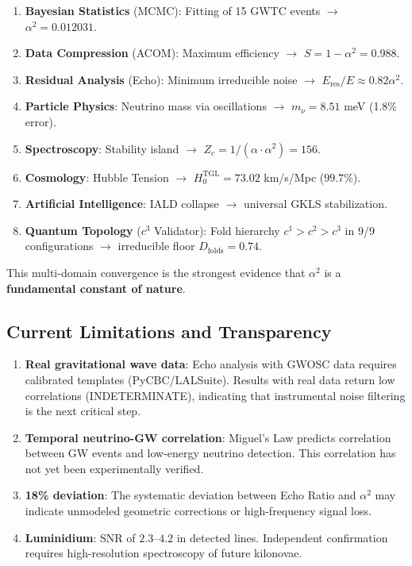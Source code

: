 \documentclass[12pt,a4paper,twoside]{article}
\newcommand{\alphaii}{\alpha^{2}}
\begin{document}
\begin{enumerate}[nosep]
\item \textbf{Bayesian Statistics} (MCMC): Fitting of 15 GWTC events $\to$ $\alphaii = 0.012031$.
\item \textbf{Data Compression} (ACOM): Maximum efficiency $\to$ $S = 1 - \alphaii = 0.988$.
\item \textbf{Residual Analysis} (Echo): Minimum irreducible noise $\to$ $E_{\text{res}}/E \approx 0.82\alphaii$.
\item \textbf{Particle Physics}: Neutrino mass via oscillations $\to$ $m_\nu = 8.51$ meV (1.8\% error).
\item \textbf{Spectroscopy}: Stability island $\to$ $Z_c = 1/(\alpha \cdot \alphaii) = 156$.
\item \textbf{Cosmology}: Hubble Tension $\to$ $H_0^{\text{TGL}} = 73.02$ km/s/Mpc ($99.7\%$).
\item \textbf{Artificial Intelligence}: IALD collapse $\to$ universal GKLS stabilization.
\item \textbf{Quantum Topology} ($c^3$ Validator): Fold hierarchy $c^1 > c^2 > c^3$ in 9/9 configurations $\to$ irreducible floor $D_{\text{folds}} = 0.74$.
\end{enumerate}

\noindent This multi-domain convergence is the strongest evidence that $\alphaii$ is a \textbf{fundamental constant of nature}.

\subsection{Current Limitations and Transparency}

\begin{enumerate}[nosep]
\item \textbf{Real gravitational wave data}: Echo analysis with GWOSC data requires calibrated templates (PyCBC/LALSuite). Results with real data return low correlations (INDETERMINATE), indicating that instrumental noise filtering is the next critical step.
\item \textbf{Temporal neutrino-GW correlation}: Miguel's Law predicts correlation between GW events and low-energy neutrino detection. This correlation has not yet been experimentally verified.
\item \textbf{18\% deviation}: The systematic deviation between Echo Ratio and $\alphaii$ may indicate unmodeled geometric corrections or high-frequency signal loss.
\item \textbf{Luminidium}: SNR of $2.3$--$4.2$ in detected lines. Independent confirmation requires high-resolution spectroscopy of future kilonovae.
\end{enumerate}
\end{document}
